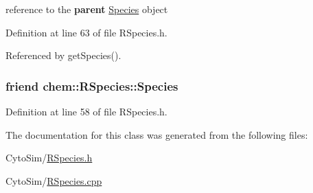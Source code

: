 reference to the {\bfseries parent} \hyperlink{classchem_1_1Species}{Species} object 



Definition at line 63 of file R\-Species.\-h.



Referenced by get\-Species().

\hypertarget{classchem_1_1RSpecies_af22c5fa6d6a8be2cd26b77fc4cbb820f}{
\subsubsection[{Species}]{\setlength{\rightskip}{0pt plus 5cm}friend {\bf chem\-::\-R\-Species\-::\-Species}}}\label{classchem_1_1RSpecies_af22c5fa6d6a8be2cd26b77fc4cbb820f}


Definition at line 58 of file R\-Species.\-h.



The documentation for this class was generated from the following files\-:\begin{DoxyCompactItemize}
\item 
Cyto\-Sim/\hyperlink{RSpecies_8h}{R\-Species.\-h}\item 
Cyto\-Sim/\hyperlink{RSpecies_8cpp}{R\-Species.\-cpp}\end{DoxyCompactItemize}
